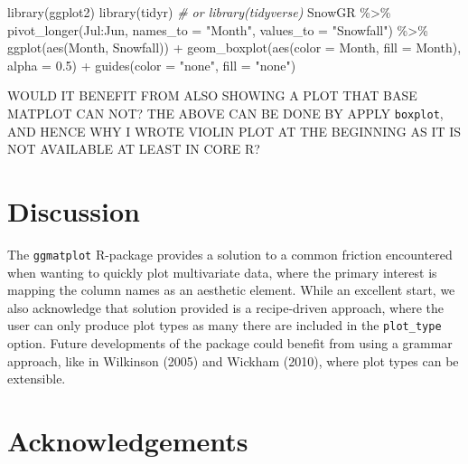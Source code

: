 \documentclass[10pt,a4paper,onecolumn]{article}
\newenvironment{Shaded}{\begin{snugshade}}{\end{snugshade}}
\newcommand{\AttributeTok}[1]{\textcolor[rgb]{0.77,0.63,0.00}{#1}}
\newcommand{\CommentTok}[1]{\textcolor[rgb]{0.56,0.35,0.01}{\textit{#1}}}
\newcommand{\FloatTok}[1]{\textcolor[rgb]{0.00,0.00,0.81}{#1}}
\newcommand{\FunctionTok}[1]{\textcolor[rgb]{0.00,0.00,0.00}{#1}}
\newcommand{\NormalTok}[1]{#1}
\newcommand{\SpecialCharTok}[1]{\textcolor[rgb]{0.00,0.00,0.00}{#1}}
\newcommand{\StringTok}[1]{\textcolor[rgb]{0.31,0.60,0.02}{#1}}
\begin{document}
\begin{Shaded}
\begin{Highlighting}[]
\FunctionTok{library}\NormalTok{(ggplot2)}
\FunctionTok{library}\NormalTok{(tidyr) }\CommentTok{\# or library(tidyverse)}
\NormalTok{SnowGR }\SpecialCharTok{\%\textgreater{}\%} 
  \FunctionTok{pivot\_longer}\NormalTok{(Jul}\SpecialCharTok{:}\NormalTok{Jun, }
               \AttributeTok{names\_to =} \StringTok{"Month"}\NormalTok{,}
               \AttributeTok{values\_to =} \StringTok{"Snowfall"}\NormalTok{) }\SpecialCharTok{\%\textgreater{}\%} 
  \FunctionTok{ggplot}\NormalTok{(}\FunctionTok{aes}\NormalTok{(Month, Snowfall)) }\SpecialCharTok{+} 
  \FunctionTok{geom\_boxplot}\NormalTok{(}\FunctionTok{aes}\NormalTok{(}\AttributeTok{color =}\NormalTok{ Month, }\AttributeTok{fill =}\NormalTok{ Month), }\AttributeTok{alpha =} \FloatTok{0.5}\NormalTok{) }\SpecialCharTok{+}
  \FunctionTok{guides}\NormalTok{(}\AttributeTok{color =} \StringTok{"none"}\NormalTok{, }\AttributeTok{fill =} \StringTok{"none"}\NormalTok{)}
\end{Highlighting}
\end{Shaded}

WOULD IT BENEFIT FROM ALSO SHOWING A PLOT THAT BASE MATPLOT CAN NOT? THE
ABOVE CAN BE DONE BY APPLY \texttt{boxplot}, AND HENCE WHY I WROTE
VIOLIN PLOT AT THE BEGINNING AS IT IS NOT AVAILABLE AT LEAST IN CORE R?

\hypertarget{discussion}{%
\section{Discussion}\label{discussion}}

The \texttt{ggmatplot} R-package provides a solution to a common
friction encountered when wanting to quickly plot multivariate data,
where the primary interest is mapping the column names as an aesthetic
element. While an excellent start, we also acknowledge that solution
provided is a recipe-driven approach, where the user can only produce
plot types as many there are included in the \texttt{plot\_type} option.
Future developments of the package could benefit from using a grammar
approach, like in Wilkinson (2005) and Wickham (2010), where plot types
can be extensible.

\hypertarget{acknowledgements}{%
\section{Acknowledgements}\label{acknowledgements}}
\end{document}
